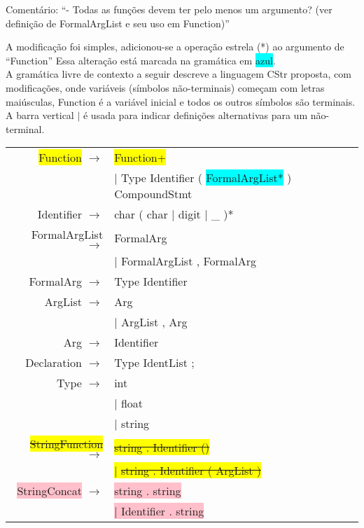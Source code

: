 \documentclass[12pt]{article}
\begin{document}
Comentário: ``- Todas as funções devem ter pelo menos um argumento? (ver definição de FormalArgList e seu uso em Function)''

A modificação foi simples, adicionou-se a operação estrela (*) ao argumento de ``Function''
Essa alteração está marcada na gramática em \colorbox{cyan}{azul}.\\

A gramática livre de contexto a seguir descreve a linguagem CStr proposta, com modificações, onde variáveis (símbolos não-terminais) começam com letras maiúsculas, Function é a variável inicial e todos os outros símbolos são terminais. A barra vertical $|$ é usada para indicar definições alternativas para um não-terminal.\\

\begin{longtable}{ r l }
	\colorbox{yellow}{Function} 		$\rightarrow$ 	& \colorbox{yellow}{Function+} \\
									& $|$ Type Identifier ( \colorbox{cyan}{FormalArgList*} ) CompoundStmt \\
	Identifier		$\rightarrow$   & char ( char $|$ digit $|$ \_ )* \\
	FormalArgList 	$\rightarrow$ 	& FormalArg \\
									& $|$ FormalArgList , FormalArg \\
	FormalArg 		$\rightarrow$ 	& Type Identifier \\
	ArgList			$\rightarrow$ 	& Arg \\
									& $|$ ArgList , Arg \\
	Arg				$\rightarrow$ 	& Identifier \\
	Declaration		$\rightarrow$ 	& Type IdentList ; \\
	Type			$\rightarrow$ 	& int \\
									& $|$ float \\
									& $|$ string \\
	\colorbox{yellow}{\sout{StringFunction}}	\sout{$\rightarrow$}	& \colorbox{yellow}{\sout{string . Identifier ()}} \\
									& \colorbox{yellow}{$|$ \sout{string . Identifier ( ArgList )}} \\
	\colorbox{pink}{StringConcat}	$\rightarrow$	& \colorbox{pink}{string . string} \\
									& \colorbox{pink}{$|$ Identifier . string}\\

\end{longtable}
\end{document}
